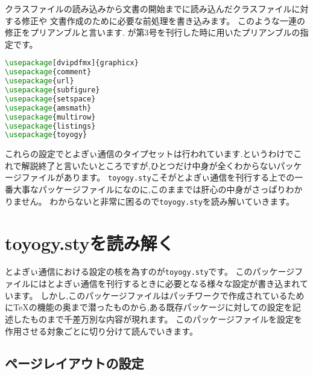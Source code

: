 クラスファイルの読み込みから文書の開始までに読み込んだクラスファイルに対する修正や
文書作成のために必要な前処理を書き込みます。
このような一連の修正をプリアンブルと言います.
が第3号を刊行した時に用いたプリアンブルの指定です。
\begin{lstlisting}[caption=プリアンブル,label=lis:preamble,language=tex]
\usepackage[dvipdfmx]{graphicx}
\usepackage{comment}
\usepackage{url}
\usepackage{subfigure}
\usepackage{setspace}
\usepackage{amsmath}
\usepackage{multirow}
\usepackage{listings}
\usepackage{toyogy}
\end{lstlisting}

これらの設定でとよぎぃ通信のタイプセットは行われています.というわけでこれで解説終了と言いたいところですが,ひとつだけ中身が全くわからないパッケージファイルがあります。
\texttt{toyogy.sty}こそがとよぎぃ通信を刊行する上での一番大事なパッケージファイルになのに,このままでは肝心の中身がさっぱりわかりません。
わからないと非常に困るので\texttt{toyogy.sty}を読み解いていきます。

\section{toyogy.styを読み解く}

とよぎぃ通信における設定の核を為すのが\texttt{toyogy.sty}です。
このパッケージファイルにはとよぎぃ通信を刊行するときに必要となる様々な設定が書き込まれています。
しかし,このパッケージファイルはパッチワークで作成されているために{\TeX}の機能の奥まで潜ったものから,ある既存パッケージに対しての設定を記述したものまで千差万別な内容が現れます。
このパッケージファイルを設定を作用させる対象ごとに切り分けて読んでいきます。

\subsection{ページレイアウトの設定}

